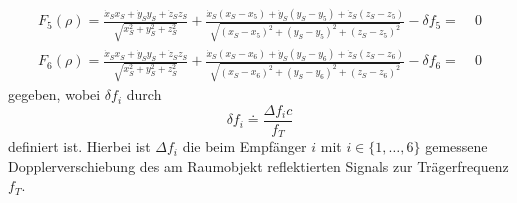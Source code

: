 \documentclass[a4paper,12pt]{article}
\numberwithin{equation}{section}
\begin{document}
\begin{align}
F_5(\rho) = \frac{\dot{x}_Sx_S+\dot{y}_Sy_S+\dot{z}_Sz_S}{\sqrt{x_S^2 + y_S^2+z_S^2}}+ \frac{\dot{x}_S(x_S-x_5)+\dot{y}_S(y_S-y_5)+\dot{z}_S(z_S-z_5)}{\sqrt{(x_S-x_5)^2 + (y_S-y_5)^2+(z_S-z_5)^2}}  -  \delta f_5  =&\;  0 \\ \label{eq:glsystshamesnonlin6}
F_6(\rho) = \frac{\dot{x}_Sx_S+\dot{y}_Sy_S+\dot{z}_Sz_S}{\sqrt{x_S^2 + y_S^2+z_S^2}}+ \frac{\dot{x}_S(x_S-x_6)+\dot{y}_S(y_S-y_6)+\dot{z}_S(z_S-z_6)}{\sqrt{(x_S-x_6)^2 + (y_S-y_6)^2+(z_S-z_6)^2}}  -  \delta f_6  =&\;  0
\end{align} \normalsize gegeben, wobei $\delta f_i$ durch \begin{equation}
\delta f_i \doteq \frac{\Delta f_i c}{f_T}
\end{equation} definiert ist. Hierbei ist $\Delta f_i$ die beim Empfänger $i$ mit $i \in \{1,\dots,6\}$ gemessene Dopplerverschiebung des am Raumobjekt reflektierten Signals zur Trägerfrequenz $f_T$.
\end{document}
